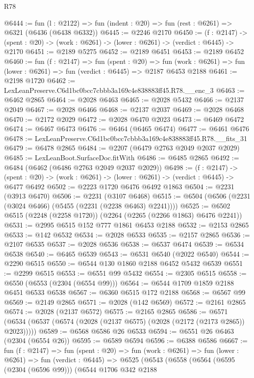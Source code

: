 \begin{lexlean}{R78}
\begin{coremodule}
@6444 := fun (l : @2122) => fun (indent : @20) => fun (rest : @6261) => @6321 (@6436 (@6438 @6332))
@6445 := @2246 @2170
@6450 := (f : @2147) ->
  (spent : @20) -> (work : @6261) -> (lower : @6261) -> (verdict : @6445) -> @2170
@6451 := @2189 @5275
@6452 := @2189 @6451
@6453 := @2189 @6452
@6460 := fun (f : @2147) =>
  fun (spent : @20) =>
  fun (work : @6261) => fun (lower : @6261) => fun (verdict : @6445) => @2187 @6453 @2188
@6461 := @2198 @1720
@6462 := LexLeanPreserve.C6d1bc0bcc7cbbb3a169c4e838883ff45.R78.__enc_3
@6463 := @6462 @2865
@6464 := @2028 @6463
@6465 := @2028 @5432
@6466 := @2137 @2049
@6467 := @2028 @6466
@6468 := @2137 @2037
@6469 := @2028 @6468
@6470 := @2172 @2029
@6472 := @2028 @6470 @2023
@6473 := @6469 @6472
@6474 := @6467 @6473
@6476 := @6464 (@6465 @6474)
@6477 := @6461 @6476
@6478 := LexLeanPreserve.C6d1bc0bcc7cbbb3a169c4e838883ff45.R78.__fits_31
@6479 := @6478 @2865
@6484 := @2207 (@6479 @2763 @2049 @2037 @2029)
@6485 := LexLeanBoot.SurfaceDoc.fitWith
@6486 := @6485 @2865
@6492 := @6484 (@6462 (@6486 @2763 @2049 @2037 @2029))
@6498 := (f : @2147) ->
  (spent : @20) -> (work : @6261) -> (lower : @6261) -> (verdict : @6445) -> @6477 @6492
@6502 := @2223 @1720 @6476 @6492 @1863
@6504 := @2231 (@3913 @6470)
@6506 := @2231 (@3107 @6468)
@6515 := @6504 (@6506 (@2231 (@3024 @6466) (@5455 (@2231 (@2238 @6463) @2241))))
@6525 := @6502 @6515 (@2248 (@2258 @1720)) (@2264 (@2265 (@2266 @1863) @6476 @2241))
@6531 := @2995 @6515 @152 @777 @1861 @6453 @2188
@6532 := @2153 @2865
@6533 := @142 @6532
@6534 := @2028 @6533
@6535 := @2157 @2865
@6536 := @2107 @6535
@6537 := @2028 @6536
@6538 := @6537 @6474
@6539 := @6534 @6538
@6540 := @6465 @6539
@6543 := @6531 @6540 (@2022 @6540)
@6544 := @2290 @6515
@6550 := @6544 @130 @1860 @2188 @6452 @5432 @6539
@6551 := @2299 @6515
@6553 := @6551 @99 @5432
@6554 := @2305 @6515
@6558 := @6550 (@6553 (@2304 (@6554 @99)))
@6564 := @6544 @1709 @1859 @2188 @6451 @6533 @6538
@6567 := @6360 @6515 @172 @2188
@6568 := @6567 @99
@6569 := @2149 @2865
@6571 := @2028 (@142 @6569)
@6572 := @2161 @2865
@6574 := @2028 (@2137 @6572)
@6575 := @2165 @2865
@6586 := @6571 (@6534 (@6537 (@6574 (@2028 (@2137 @6575) (@2028 (@2172 (@2173 @2865)) @2023)))))
@6589 := @6568 @6586 @26 @6533
@6594 := @6551 @26 @6463 (@2304 (@6554 @26))
@6595 := @6589 @6594
@6596 := @6388 @6586
@6667 := fun (f : @2147) =>
  fun (spent : @20) =>
  fun (work : @6261) =>
  fun (lower : @6261) =>
  fun (verdict : @6445) =>
  @6525
    (@6543
      (@6558
        (@6564
          (@6595 (@2304 (@6596 @99)))
          (@6544
            @1706
            @342
            @2188

\end{coremodule}
\end{lexlean}
